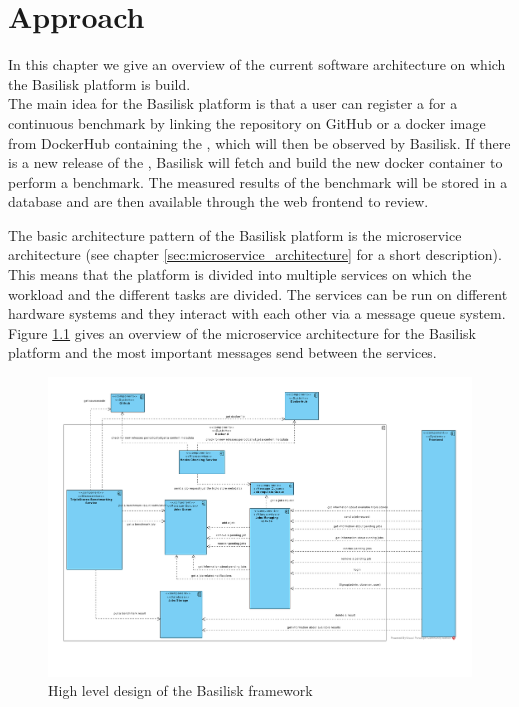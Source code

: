 \chapter{Approach}
\label{ch:approach}

In this chapter we give an overview of the current software architecture on which the Basilisk platform is build.
\\

The main idea for the Basilisk platform is that a user can register a \ts{} for a continuous benchmark by linking the repository on GitHub or a docker image from DockerHub containing the \ts{}, which will then be observed by Basilisk.
If there is a new release of the \ts{}, Basilisk will fetch and build the new docker container to perform a benchmark.
The measured results of the benchmark will be stored in a database and are then available through the web frontend to review.


The basic architecture pattern of the Basilisk platform is the microservice architecture (see chapter \ref{sec:microservice_architecture} for a short description). 
This means that the platform is divided into multiple services on which the workload and the different tasks are divided.
The services can be run on different hardware systems and they interact with each other via a message queue system.
\\

Figure \ref{fig:basilisk_high_level_design} gives an overview of the microservice architecture for the Basilisk platform and the most important messages send between the services.
\begin{figure}[tbph]
	\centering
	\includegraphics[width=1.1\textwidth]{figures/basilisk_high_level_design.pdf}
	\caption{High level design of the Basilisk framework}
	\label{fig:basilisk_high_level_design}
\end{figure}
\\

